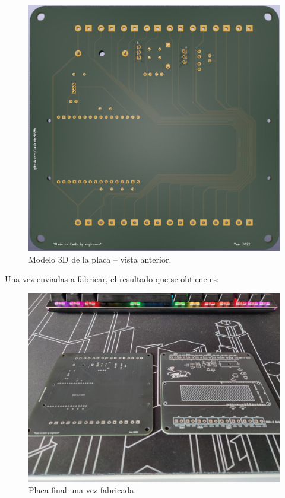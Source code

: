\begin{figure}[H]
\begin{minipage}{.48\linewidth}
    \includegraphics[width=\linewidth]{images/pcb-3d-back.png}
    \caption{Modelo 3D de la placa -- vista anterior.}
    \label{fig:3d-pcb-back}
  \end{minipage}
\end{figure}

Una vez enviadas a fabricar, el resultado que se obtiene es:

\begin{figure}[H]
  \centering
  \includegraphics[width=\linewidth]{images/board.jpg}
  \caption{Placa final una vez fabricada.}
  \label{fig:board}
\end{figure}

